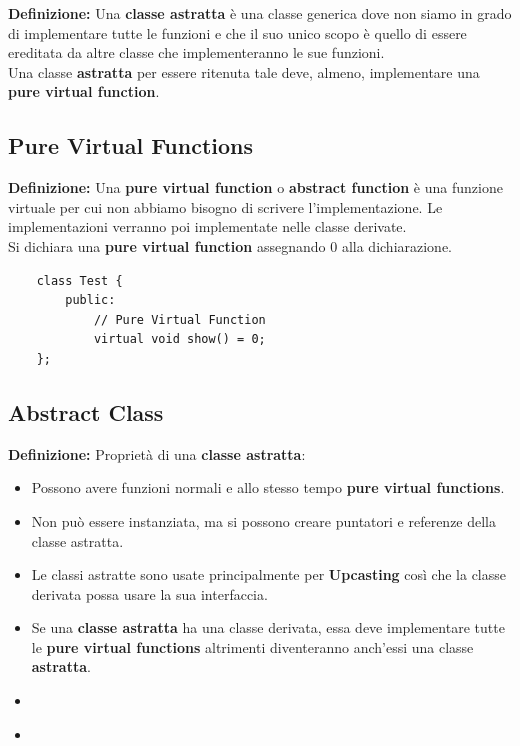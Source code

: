 \textsf{\small \textbf{Definizione: } Una \textbf{classe astratta} è una classe generica dove non siamo in grado di implementare tutte le funzioni e che il suo unico scopo è quello di essere ereditata da altre classe che implementeranno le sue funzioni.} \\

\textsf{\small Una classe \textbf{astratta} per essere ritenuta tale deve, almeno, implementare una \textbf{pure virtual function}.} \\

\subsection{Pure Virtual Functions}

\textsf{\small \textbf{Definizione: } Una \textbf{pure virtual function} o \textbf{abstract function} è una funzione virtuale per cui non abbiamo bisogno di scrivere l'implementazione. Le implementazioni verranno poi implementate nelle classe derivate.} \\

\textsf{\small Si dichiara una \textbf{pure virtual function} assegnando 0 alla dichiarazione.} \\

\begin{lstlisting}
	class Test {
		public:
			// Pure Virtual Function
			virtual void show() = 0;
	};
\end{lstlisting}

\subsection{Abstract Class}

\textsf{\small \textbf{Definizione: } Proprietà di una \textbf{classe astratta}: } \\

\begin{itemize}
	\item \textsf{\small Possono avere funzioni normali e allo stesso tempo \textbf{pure virtual functions}.}
	\item \textsf{\small Non può essere instanziata, ma si possono creare puntatori e referenze della classe astratta.}
	\item \textsf{\small Le classi astratte sono usate principalmente per \textbf{Upcasting} così che la classe derivata possa usare la sua interfaccia.}
	\item \textsf{\small Se una \textbf{classe astratta} ha una classe derivata, essa deve implementare tutte le \textbf{pure virtual functions} altrimenti diventeranno anch'essi una classe \textbf{astratta}.}
	\item \textsf{\small }
	\item \textsf{\small }
\end{itemize}


